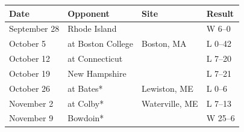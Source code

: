 \documentclass{article}
\begin{document}
\begin{tabular}{llll}
\toprule
Date & Opponent & Site & Result \\
\midrule
September 28 & Rhode Island &  & W 6–0 \\
October 5 & at Boston College & Boston, MA & L 0–42 \\
October 12 & at Connecticut &  & L 7–20 \\
October 19 & New Hampshire &  & L 7–21 \\
October 26 & at Bates* & Lewiston, ME & L 0–6 \\
November 2 & at Colby* & Waterville, ME & L 7–13 \\
November 9 & Bowdoin* &  & W 25–6 \\
\bottomrule
\end{tabular}
\end{document}
